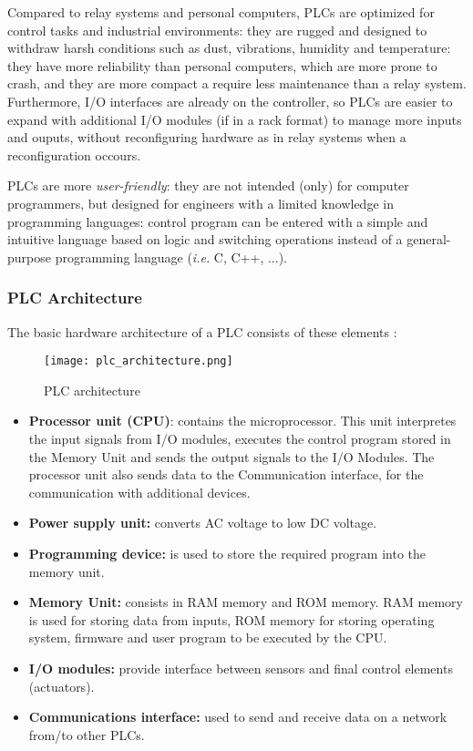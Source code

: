 \bigskip
Compared to relay systems and personal computers, PLCs are optimized for control tasks and industrial environments: they are rugged and designed to withdraw harsh conditions such as dust, vibrations, humidity and temperature: they have more reliability than personal computers, which are more prone to crash, and they are more compact a require less maintenance than a relay system.
Furthermore, I/O interfaces are already on the controller, so PLCs are easier to expand with additional I/O modules (if in a rack format) to manage more inputs and ouputs, without reconfiguring hardware as in relay systems when a reconfiguration occours. 

\bigskip
PLCs are more \textit{user-friendly}: they are not intended (only) for computer programmers, but designed for engineers with a limited knowledge in programming languages: control program can be entered with a simple and intuitive language based on logic and switching operations instead of a general-purpose programming language (\textit{i.e.} C, C++, ...). 

\subsubsection{PLC Architecture}
The basic hardware architecture of a PLC consists of these elements \cite{plc_book}:

\begin{figure}[ht]
	\centering
	\texttt{[image: plc\_architecture.png]}
	\caption{PLC architecture}
	\label{fig:PLC_architecture}
\end{figure}

\begin{itemize}
	\item \textbf{Processor unit (CPU)}: contains the microprocessor. This unit interpretes the input signals from I/O modules, executes the control program stored in the Memory Unit and sends the output signals to the I/O Modules.
	The processor unit also sends data to the Communication interface, for the communication with additional devices.
	\item \textbf{Power supply unit:} converts AC voltage to low DC voltage.
	\item \textbf{Programming device:} is used to store the required program into the memory unit.
	\item \textbf{Memory Unit:} consists in RAM memory and ROM memory. RAM memory is used for storing data from inputs, ROM memory for storing operating system, firmware and user program to be executed by the CPU.
	\item \textbf{I/O modules:} provide interface between sensors and final control elements (actuators).
	\item \textbf{Communications interface:} used to send and receive data on a network from/to other PLCs.
\end{itemize}

